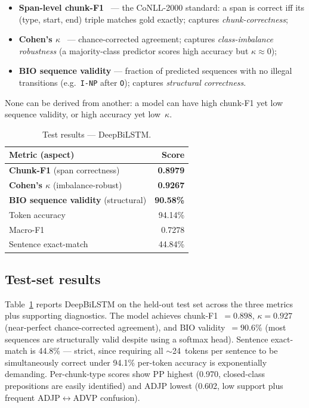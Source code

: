 \documentclass[10pt,a4paper,twocolumn]{article}
\begin{document}
\begin{itemize}
    \item \textbf{Span-level chunk-F1}~\citep{Sang2000} — the CoNLL-2000 standard:
    a span is correct iff its (type, start, end) triple matches gold exactly;
    captures \emph{chunk-correctness};
    
    \item \textbf{Cohen's $\kappa$}~\citep{Cohen1960} — chance-corrected agreement;
    captures \emph{class-imbalance robustness} (a majority-class predictor scores
    high accuracy but $\kappa\!\approx\!0$);
    
    \item \textbf{BIO sequence validity} — fraction of predicted sequences with
    no illegal transitions (e.g.\ \texttt{I-NP} after \texttt{O}); captures
    \emph{structural correctness}.
\end{itemize}

None can be derived from another: a model can have high chunk-F1 yet
low sequence validity, or high accuracy yet low~$\kappa$.

\begin{table}[t]\centering\footnotesize
\caption{Test results — DeepBiLSTM.}
\label{tab:test}
\begin{tabular}{@{}lr@{}}
\toprule
Metric (aspect) & Score \\
\midrule
\textbf{Chunk-F1} (span correctness) & \textbf{0.8979} \\
\textbf{Cohen's $\kappa$} (imbalance-robust) & \textbf{0.9267} \\
\textbf{BIO sequence validity} (structural) & \textbf{90.58\%} \\
\midrule
Token accuracy        & 94.14\% \\
Macro-F1              & 0.7278  \\
Sentence exact-match  & 44.84\% \\
\bottomrule
\end{tabular}
\end{table}

\subsection*{Test-set results}
Table~\ref{tab:test} reports DeepBiLSTM on the held-out test set across the
three metrics plus supporting diagnostics. The model achieves chunk-F1~$=0.898$,
$\kappa=0.927$ (near-perfect chance-corrected agreement), and BIO
validity~$=90.6\%$ (most sequences are structurally valid despite using a
softmax head). Sentence exact-match is 44.8\% — strict, since requiring all
$\sim$24~tokens per sentence to be simultaneously correct under 94.1\%
per-token accuracy is exponentially demanding. Per-chunk-type scores show
PP highest (0.970, closed-class prepositions are easily identified) and
ADJP lowest (0.602, low support plus frequent ADJP$\leftrightarrow$ADVP confusion).
\end{document}
